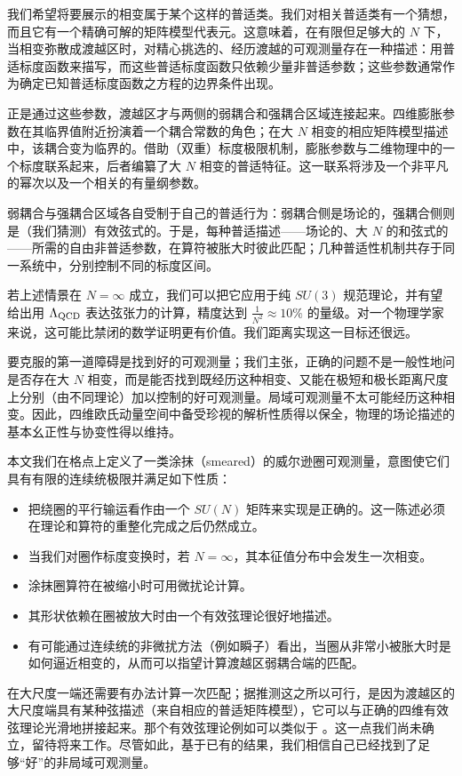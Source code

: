 我们希望将要展示的相变属于某个这样的普适类。我们对相关普适类有一个猜想，而且它有一个精确可解的矩阵模型代表元。这意味着，在有限但足够大的 $N$ 下，当相变弥散成渡越区时，对精心挑选的、经历渡越的可观测量存在一种描述：用普适标度函数来描写，而这些普适标度函数只依赖少量非普适参数；这些参数通常作为确定已知普适标度函数之方程的边界条件出现。

正是通过这些参数，渡越区才与两侧的弱耦合和强耦合区域连接起来。四维膨胀参数在其临界值附近扮演着一个耦合常数的角色；在大 $N$ 相变的相应矩阵模型描述中，该耦合变为临界的。借助（双重）标度极限机制，膨胀参数与二维物理中的一个标度联系起来，后者编纂了大 $N$ 相变的普适特征。这一联系将涉及一个非平凡的幂次以及一个相关的有量纲参数。

弱耦合与强耦合区域各自受制于自己的普适行为：弱耦合侧是场论的，强耦合侧则是（我们猜测）有效弦式的。于是，每种普适描述——场论的、大 $N$ 的和弦式的——所需的自由非普适参数，在算符被胀大时彼此匹配；几种普适性机制共存于同一系统中，分别控制不同的标度区间。

若上述情景在 $N=\infty$ 成立，我们可以把它应用于纯 $SU(3)$ 规范理论，并有望给出用 $\Lambda_{\rm QCD}$ 表达弦张力的计算，精度达到 $\frac{1}{ N^2}\approx 10\%$ 的量级。对一个物理学家来说，这可能比禁闭的数学证明更有价值。我们距离实现这一目标还很远。

要克服的第一道障碍是找到好的可观测量；我们主张，正确的问题不是一般性地问是否存在大 $N$ 相变，而是能否找到既经历这种相变、又能在极短和极长距离尺度上分别（由不同理论）加以控制的好可观测量。局域可观测量不太可能经历这种相变。因此，四维欧氏动量空间中备受珍视的解析性质得以保全，物理的场论描述的基本幺正性与协变性得以维持。

本文我们在格点上定义了一类涂抹（smeared）的威尔逊圈可观测量，意图使它们具有有限的连续统极限并满足如下性质：
\begin{itemize}
\item 把绕圈的平行输运看作由一个 $SU(N)$ 矩阵来实现是正确的。这一陈述必须在理论和算符的重整化完成之后仍然成立。
\item 当我们对圈作标度变换时，若 $N=\infty$，其本征值分布中会发生一次相变。
\item 涂抹圈算符在被缩小时可用微扰论计算。
\item 其形状依赖在圈被放大时由一个有效弦理论很好地描述。
\item 有可能通过连续统的非微扰方法（例如瞬子）看出，当圈从非常小被胀大时是如何逼近相变的，从而可以指望计算渡越区弱耦合端的匹配。
\end{itemize}
在大尺度一端还需要有办法计算一次匹配；据推测这之所以可行，是因为渡越区的大尺度端具有某种弦描述（来自相应的普适矩阵模型），它可以与正确的四维有效弦理论光滑地拼接起来。那个有效弦理论例如可以类似于 \cite{ps6}。这一点我们尚未确立，留待将来工作。尽管如此，基于已有的结果，我们相信自己已经找到了足够``好''的非局域可观测量。

